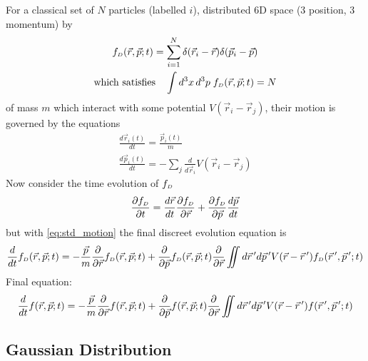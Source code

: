For a classical set of $N$ particles (labelled $i$), distributed 6D space (3 position, 3 momentum) by 
\begin{gather}
  f_{{\scriptscriptstyle D}}(\vec{r}, \vec{p}; t) = 
  \sum\limits^{N}_{i=1} \delta(\vec{r}_{i} - \vec{r}) \delta(\vec{p}_{i} - \vec{p}) \\
  \text{which satisfies} \quad \int d^{3}x\,d^{3}p \; f_{{\scriptscriptstyle D}}(\vec{r}, \vec{p}; t) = N
\end{gather}
of mass $m$ which interact with some potential $V(\vec{r}_{i} - \vec{r}_{j})$, their motion is governed by the equations
\begin{subequations}\label{eq:std_motion}
\begin{gather}
  \frac{d\vec{r}_{i}(t)}{dt} = \frac{\vec{p}_{i}(t)}{m}\\
  \frac{d\vec{p}_{i}(t)}{dt} = -\sum\limits_{j} \frac{d}{d\vec{r}_{i}} V(\vec{r}_{i} - \vec{r}_{j})
\end{gather}
\end{subequations}
Now consider the time evolution of $f_{{\scriptscriptstyle D}}$
\begin{equation}
  \frac{\partial f_{{\scriptscriptstyle D}}}{\partial t} = 
  \frac{d\vec{r}}{dt} \frac{\partial f_{{\scriptscriptstyle D}}}{\partial \vec{r}} 
  + \frac{\partial f_{{\scriptscriptstyle D}}}{\partial \vec{p}} \frac{d\vec{p}}{dt}
\end{equation}
but with \ref{eq:std_motion} the final discreet evolution equation is
\begin{equation}
  \frac{d}{dt} f_{{\scriptscriptstyle D}}(\vec{r}, \vec{p}; t) =
  -\frac{\vec{p}}{m} \frac{\partial}{\partial \vec{r}} f_{{\scriptscriptstyle D}}(\vec{r}, \vec{p}; t)
  + \frac{\partial}{\partial \vec{p}} f_{{\scriptscriptstyle D}} (\vec{r}, \vec{p}; t)
  \frac{\partial}{\partial \vec{r}} \iint d\vec{r}\,^{\prime} d\vec{p}\,^{\prime} V(\vec{r} - \vec{r}\,^{\prime}) f_{{\scriptscriptstyle D}}(\vec{r}\,^{\prime},\vec{p}\,^{\prime};t)
\end{equation}
Final equation:
\begin{equation}
  \frac{d}{dt} f(\vec{r}, \vec{p}; t) =
  -\frac{\vec{p}}{m} \frac{\partial}{\partial \vec{r}} f(\vec{r}, \vec{p}; t)
  + \frac{\partial}{\partial \vec{p}} f (\vec{r}, \vec{p}; t)
  \frac{\partial}{\partial \vec{r}} \iint d\vec{r}\,^{\prime} d\vec{p}\,^{\prime} V(\vec{r} - \vec{r}\,^{\prime}) f(\vec{r}\,^{\prime},\vec{p}\,^{\prime};t)
\end{equation}

\subsection{Gaussian Distribution}

